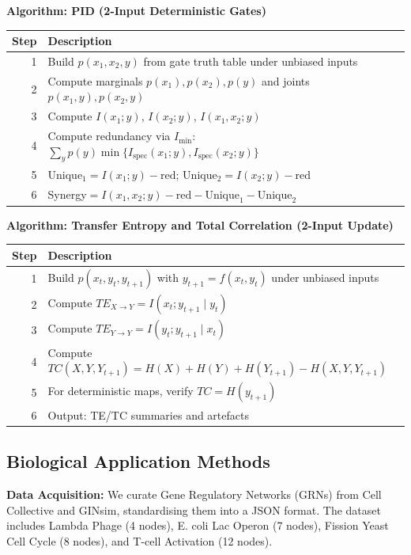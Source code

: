 \documentclass[11pt]{article}
\begin{document}
\textbf{Algorithm: PID (2-Input Deterministic Gates)}\\
\begin{center}
\begin{tabular}{rl}
\hline
Step & Description \\
\hline
1 & Build $p(x_1,x_2,y)$ from gate truth table under unbiased inputs \\
2 & Compute marginals $p(x_1),p(x_2),p(y)$ and joints $p(x_1,y),p(x_2,y)$ \\
3 & Compute $I(x_1;y)$, $I(x_2;y)$, $I(x_1,x_2;y)$ \\
4 & Compute redundancy via $I_{\min}$: $\sum_y p(y)\min\{I_{\mathrm{spec}}(x_1;y),I_{\mathrm{spec}}(x_2;y)\}$ \\
5 & Unique$_1=I(x_1;y)-\mathrm{red}$; Unique$_2=I(x_2;y)-\mathrm{red}$ \\
6 & Synergy$=I(x_1,x_2;y)-\mathrm{red}-\mathrm{Unique}_1-\mathrm{Unique}_2$ \\
\hline
\end{tabular}
\end{center}

\textbf{Algorithm: Transfer Entropy and Total Correlation (2-Input Update)}\\
\begin{center}
\begin{tabular}{rl}
\hline
Step & Description \\
\hline
1 & Build $p(x_t,y_t,y_{t+1})$ with $y_{t+1}=f(x_t,y_t)$ under unbiased inputs \\
2 & Compute $TE_{X\to Y}=I(x_t;y_{t+1}\mid y_t)$ \\
3 & Compute $TE_{Y\to Y}=I(y_t;y_{t+1}\mid x_t)$ \\
4 & Compute $TC(X,Y,Y_{t+1})=H(X)+H(Y)+H(Y_{t+1})-H(X,Y,Y_{t+1})$ \\
5 & For deterministic maps, verify $TC=H(y_{t+1})$ \\
6 & Output: TE/TC summaries and artefacts \\
\hline
\end{tabular}
\end{center}

\subsection{Biological Application Methods}
\textbf{Data Acquisition:} We curate Gene Regulatory Networks (GRNs) from Cell Collective and GINsim, standardising them into a JSON format. The dataset includes Lambda Phage (4 nodes), E. coli Lac Operon (7 nodes), Fission Yeast Cell Cycle (8 nodes), and T-cell Activation (12 nodes).
\end{document}
